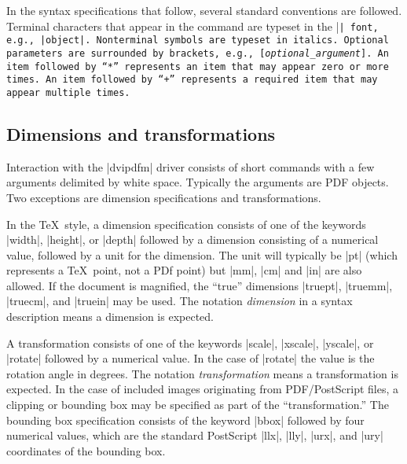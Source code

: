 In the syntax specifications that follow, several
standard conventions are followed.  Terminal
characters that appear in the command 
are typeset in the |\tt| font, e.g., |object|.
Nonterminal symbols are typeset in italics.
Optional parameters are surrounded by brackets, e.g.,
[{\it optional\_argument}].  An item followed
by~``{*}'' represents an item that may appear
zero or more times.  An item followed by~``{+}''
represents a required item that may appear multiple times.

\subsection{Dimensions and transformations}
Interaction with the |dvipdfm| driver consists
of short commands with a few arguments delimited by white space.
Typically the arguments are PDF objects.
Two exceptions are dimension specifications and transformations.

In the \TeX\ style, a dimension specification consists of one of the keywords
|width|, |height|, or |depth| followed by a dimension
consisting of a numerical value, followed by a unit for the dimension.  The
unit will typically be |pt| (which represents a \TeX\ point, not a
PDf point) but |mm|, |cm| and |in| are also allowed.
If the document is magnified, the ``true'' dimensions |truept|,
|truemm|, |truecm|, and |truein| may be used.  The notation
{\it dimension\/} in a syntax description means a dimension is expected.

A transformation consists of one of the keywords |scale|, |xscale|,
|yscale|, or |rotate| followed by a numerical value.  In the
case of |rotate| the value is the rotation angle in degrees.
The notation
{\it transformation} means a transformation is expected.
In the case of included images originating from
PDF/PostScript files, a clipping or bounding box may be specified
as part of the ``transformation.''  The bounding
box specification consists of the keyword |bbox|
followed by four numerical values, which are 
the standard PostScript |llx|, |lly|, |urx|, and |ury|
coordinates of the bounding box.

